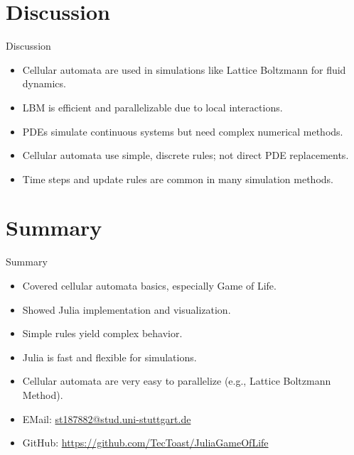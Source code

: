 \section{Discussion}
\begin{frame}{Discussion}
    \begin{itemize}
        \item Cellular automata are used in simulations like Lattice Boltzmann for fluid dynamics.
        \item LBM is efficient and parallelizable due to local interactions.
        \item PDEs simulate continuous systems but need complex numerical methods.
        \item Cellular automata use simple, discrete rules; not direct PDE replacements.
        \item Time steps and update rules are common in many simulation methods.
    \end{itemize}

\end{frame}


\section{Summary}
\begin{frame}{Summary}
    \begin{itemize}
        \item Covered cellular automata basics, especially Game of Life.
        \item Showed Julia implementation and visualization.
        \item Simple rules yield complex behavior.
        \item Julia is fast and flexible for simulations.
        \item Cellular automata are very easy to parallelize (e.g., Lattice Boltzmann Method).
              \vspace{1em}
        \item EMail: \url{st187882@stud.uni-stuttgart.de}
        \item GitHub: \url{https://github.com/TecToast/JuliaGameOfLife}
    \end{itemize}
\end{frame}